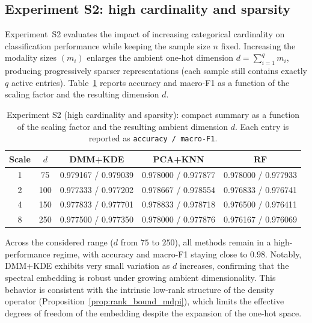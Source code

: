 \documentclass[preprint,11pt]{elsarticle}
\begin{document}
\subsection{Experiment S2: high cardinality and sparsity}
\label{subsec:synthetic_s2}

Experiment~S2 evaluates the impact of increasing categorical cardinality on classification performance while keeping the sample size $n$
fixed. Increasing the modality sizes $(m_i)$ enlarges the ambient one-hot dimension $d=\sum_{i=1}^q m_i$, producing progressively sparser
representations (each sample still contains exactly $q$ active entries).
Table~\ref{tab:s2_results_compact} reports accuracy and macro-F1 as a function of the scaling factor and the resulting dimension $d$.

\begin{table}[H]
\centering
\caption{Experiment S2 (high cardinality and sparsity): compact summary as a function of the scaling factor and the resulting ambient
dimension $d$. Each entry is reported as \texttt{accuracy / macro-F1}.}
\label{tab:s2_results_compact}
\setlength{\tabcolsep}{6pt}
\renewcommand{\arraystretch}{1.12}
\begin{tabular}{c c c c c}
\toprule
Scale & $d$ & DMM+KDE & PCA+KNN & RF \\
\midrule
1  & 75  & 0.979167 / 0.979039 & 0.978000 / 0.977877 & 0.978000 / 0.977933 \\
2  & 100 & 0.977333 / 0.977202 & 0.978667 / 0.978554 & 0.976833 / 0.976741 \\
4  & 150 & 0.977833 / 0.977701 & 0.978833 / 0.978718 & 0.976500 / 0.976411 \\
8  & 250 & 0.977500 / 0.977350 & 0.978000 / 0.977876 & 0.976167 / 0.976069 \\
\bottomrule
\end{tabular}
\end{table}

Across the considered range ($d$ from $75$ to $250$), all methods remain in a high-performance regime, with accuracy and macro-F1
staying close to $0.98$. Notably, DMM+KDE exhibits very small variation as $d$ increases, confirming that the spectral embedding is
robust under growing ambient dimensionality. This behavior is consistent with the intrinsic low-rank structure of the density operator
(Proposition~\ref{prop:rank_bound_mdpi}), which limits the effective degrees of freedom of the embedding despite the expansion of the
one-hot space.
\end{document}
